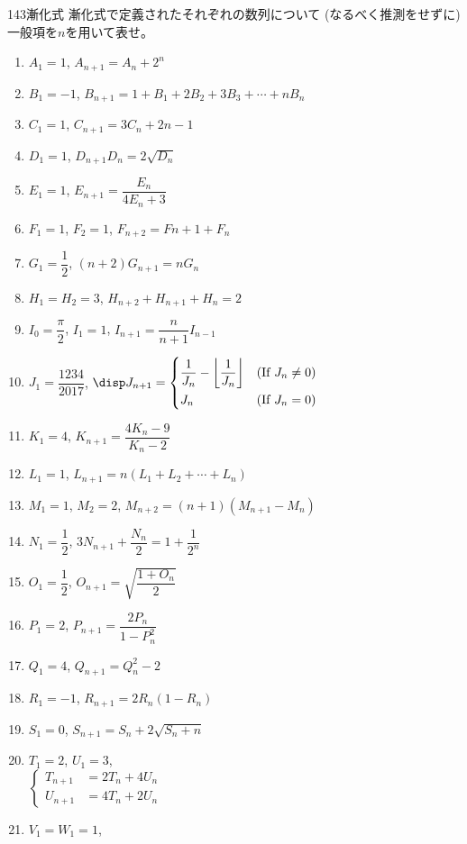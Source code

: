 \begin{prob}{143}{}{漸化式}
 漸化式で定義されたそれぞれの数列について (なるべく推測をせずに) 一般項を$n$を用いて表せ。
 \begin{enumerate}
  \item $A_1=1$, $A_{n+1}=A_n+2^n$
  \item $B_1=-1$, $B_{n+1}=1+B_1+2B_2+3B_3+\cdots+nB_n$
  \item $C_1=1$, $C_{n+1}=3C_n+2n-1$
  \item $D_1=1$, $D_{n+1}D_n=2\sqrt{D_n}$
  \item $E_1=1$, $E_{n+1}=\dfrac{E_n}{4E_n+3}$
  \item $F_1=1$, $F_2=1$, $F_{n+2}=F{n+1}+F_n$
  \item $G_1=\dfrac{1}{2}$, $(n+2)G_{n+1}=nG_n$
  \item $H_1=H_2=3$, $H_{n+2}+H_{n+1}+H_n=2$
  \item $I_0=\dfrac{\pi}{2}$, $I_1=1$, $I_{n+1}=\dfrac{n}{n+1}I_{n-1}$
  \item $J_1=\dfrac{1234}{2017}$, 
	$\disp J_{n+1}=\left\{
	\begin{aligned}
	 &\frac{1}{J_n}-\left\lfloor\frac{1}{J_n}\right\rfloor & &\text{(If $J_n\neq 0$)} \\
	 &J_n & &\text{(If $J_n=0$)}
	\end{aligned}
	 \right.$
  \item $K_1=4$, $K_{n+1}=\dfrac{4K_n-9}{K_n-2}$
  \item $L_1=1$, $L_{n+1}=n(L_1+L_2+\cdots+L_n)$
  \item $M_1=1$, $M_2=2$, $M_{n+2}=(n+1)(M_{n+1}-M_n)$
  \item $N_1=\dfrac{1}{2}$, $3N_{n+1}+\dfrac{N_n}{2}=1+\dfrac{1}{2^n}$
  \item $O_1=\dfrac{1}{2}$, $O_{n+1}=\sqrt{\dfrac{1+O_n}{2}}$
  \item $P_1=2$, $P_{n+1}=\dfrac{2P_n}{1-P_n^2}$
  \item $Q_1=4$, $Q_{n+1}=Q_n^2-2$
  \item $R_1=-1$, $R_{n+1}=2R_n(1-R_n)$
  \item $S_1=0$, $S_{n+1}=S_n+2\sqrt{S_n+n}$
  \item $T_1=2$, $U_1=3$,\\
	$\left\{
	\begin{aligned}
	 T_{n+1}&=2T_n+4U_n \\
	 U_{n+1}&=4T_n+2U_n
	\end{aligned}
	\right.$
  \item $V_1=W_1=1$, \\

\end{enumerate}
\end{prob}
